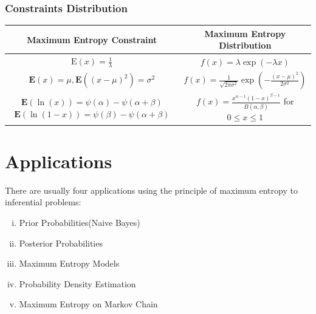 \documentclass[12pt, a4paper]{article}
\begin{document}
\subsubsection{Constraints Distribution}
\begin{table}[H]
\centering
\begin{tabular}{|c|c|}
\hline
Maximum Entropy Constraint & Maximum Entropy Distribution\\
\hline

$\mathrm{E}(x)=\frac{1}{\lambda}$&$f(x)=\lambda \exp (-\lambda x)$\\
$\mathbf{E}(x)=\mu, \mathbf{E}\left((x-\mu)^{2}\right)=\sigma^{2}$&$f(x)=\frac{1}{\sqrt{2 \pi \sigma^{2}}} \exp \left(-\frac{(x-\mu)^{2}}{2 \sigma^{2}}\right)$\\
$\mathbf{E}(\ln (x))=\psi(\alpha)-\psi(\alpha+\beta)$
$\mathbf{E}(\ln (1-x))=\psi(\beta)-\psi(\alpha+\beta)$&$f(x)=\frac{x^{\alpha-1}(1-x)^{\beta-1}}{B(\alpha, \beta)}$ for $0 \leq x \leq 1$\\
\hline
\end{tabular}
\end{table}













\section{Applications}
There are usually four applications using the principle of maximum entropy\cite{wiki:Principle_of_maximum_entropy} to inferential problems:
\begin{enumerate}[(i)]
\item Prior Probabilities(Naive Bayes)
\item Posterior Probabilities
\item Maximum Entropy Models
\item Probability Density Estimation
\item Maximum Entropy on Markov Chain
\end{enumerate}
\end{document}
